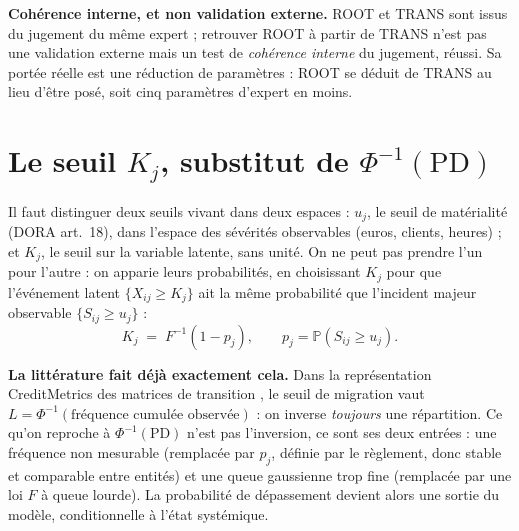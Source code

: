 \begin{attention}
\textbf{Cohérence interne, et non validation externe.} ROOT et TRANS sont issus du jugement du
même expert ; retrouver ROOT à partir de TRANS n'est pas une validation externe mais un test de
\emph{cohérence interne} du jugement, réussi. Sa portée réelle est une réduction de
paramètres : ROOT se déduit de TRANS au lieu d'être posé, soit cinq paramètres d'expert en
moins.
\end{attention}


\section{Le seuil $K_j$, substitut de $\Phi^{-1}(\mathrm{PD})$}

Il faut distinguer deux seuils vivant dans deux espaces : $u_j$, le seuil de matérialité
(DORA art.~18), dans l'espace des sévérités observables (euros, clients, heures) ; et $K_j$, le
seuil sur la variable latente, sans unité. On ne peut pas prendre l'un pour l'autre : on
apparie leurs probabilités, en choisissant $K_j$ pour que l'événement latent
$\{X_{ij}\ge K_j\}$ ait la même probabilité que l'incident majeur observable
$\{S_{ij}\ge u_j\}$ :
\begin{equation}
\boxed{\;K_j\;=\;F^{-1}(1-p_j), \qquad p_j=\mathbb P(S_{ij}\ge u_j).\;}
\end{equation}

\begin{cle}
\textbf{La littérature fait déjà exactement cela.} Dans la représentation CreditMetrics des
matrices de transition \citep{jpmorgan1997}, le seuil de migration vaut
$L=\Phi^{-1}(\text{fréquence cumulée observée})$ : on inverse \emph{toujours} une répartition. Ce
qu'on reproche à $\Phi^{-1}(\mathrm{PD})$ n'est pas l'inversion, ce sont ses deux entrées : une
fréquence non mesurable (remplacée par $p_j$, définie par le règlement, donc stable et
comparable entre entités) et une queue gaussienne trop fine (remplacée par une loi $F$ à queue
lourde). La probabilité de dépassement devient alors une sortie du modèle,
conditionnelle à l'état systémique.
\end{cle}

